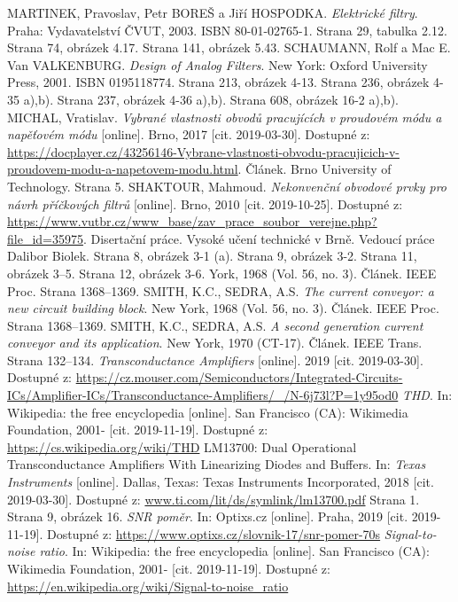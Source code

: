 \begin{thebibliography}{999}
MARTINEK, Pravoslav, Petr BOREŠ a Jiří HOSPODKA. \textit{Elektrické filtry}. Praha: Vydavatelství ČVUT, 2003. ISBN 80-01-02765-1. Strana 
29, tabulka 2.12. Strana 74, obrázek 4.17. Strana 141, obrázek 5.43.
SCHAUMANN, Rolf a Mac E. Van VALKENBURG. \textit{Design of Analog Filters}. New York: Oxford University Press, 2001. ISBN 0195118774. Strana 213, obrázek 4-13. Strana 236, obrázek 4-35 a),b). Strana 237, obrázek 4-36 a),b). Strana 608, obrázek 16-2 a),b).
MICHAL, Vratislav. \textit{Vybrané vlastnosti obvodů pracujících v proudovém módu a napěťovém módu} [online]. Brno, 2017 [cit. 2019-03-30]. Dostupné z: \url{https://docplayer.cz/43256146-Vybrane-vlastnosti-obvodu-pracujicich-v-proudovem-modu-a-napetovem-modu.html}. Článek. Brno University of Technology. Strana 5.
SHAKTOUR, Mahmoud. \textit{Nekonvenční obvodové prvky pro návrh příčkových filtrů} [online]. Brno, 2010 [cit. 2019-10-25]. Dostupné z: \url{https://www.vutbr.cz/www_base/zav_prace_soubor_verejne.php?file_id=35975}. Disertační práce. Vysoké učení technické v Brně. Vedoucí práce Dalibor Biolek. Strana 8, obrázek 3-1 (a). Strana 9, obrázek 3-2. Strana 11, obrázek 3--5. Strana 12, obrázek 3-6.
York, 1968 (Vol. 56, no. 3). Článek. IEEE Proc. Strana 1368--1369.
SMITH, K.C., SEDRA, A.S. \textit{The current conveyor: a new circuit building block}. New York, 1968 (Vol. 56, no. 3). Článek. IEEE Proc. Strana 1368--1369.
SMITH, K.C., SEDRA, A.S. \textit{A second generation current conveyor and its application}. New York, 1970 (CT-17). Článek. IEEE Trans. Strana 132--134.
\textit{Transconductance Amplifiers} [online]. 2019 [cit. 2019-03-30]. Dostupné z: \url{https://cz.mouser.com/Semiconductors/Integrated-Circuits-ICs/Amplifier-ICs/Transconductance-Amplifiers/_/N-6j73l?P=1y95od0}
\textit{THD}. In: Wikipedia: the free encyclopedia [online]. San Francisco (CA): Wikimedia Foundation, 2001- [cit. 2019-11-19]. Dostupné z: \url{https://cs.wikipedia.org/wiki/THD}
LM13700: Dual Operational Transconductance Amplifiers With Linearizing Diodes and Buffers. In: \textit{Texas Instruments} [online]. Dallas, Texas: Texas Instruments Incorporated, 2018 [cit. 2019-03-30]. Dostupné z: \url{www.ti.com/lit/ds/symlink/lm13700.pdf} Strana 1. Strana 9, obrázek 16.
\textit{SNR poměr}. In: Optixs.cz [online]. Praha, 2019 [cit. 2019-11-19]. Dostupné z: \url{https://www.optixs.cz/slovnik-17/snr-pomer-70s}
\textit{Signal-to-noise ratio}. In: Wikipedia: the free encyclopedia [online]. San Francisco (CA): Wikimedia Foundation, 2001- [cit. 2019-11-19]. Dostupné z: \url{https://en.wikipedia.org/wiki/Signal-to-noise_ratio}

\end{thebibliography}
